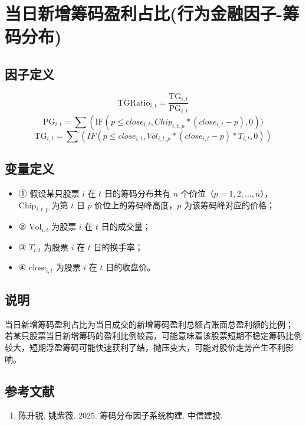 \documentclass{article}
\begin{document}
\section{当日新增筹码盈利占比(行为金融因子-筹码分布)}

\subsection{因子定义}
\begin{equation}
    \mathrm{TGRatio}_{i,t} = \frac{\mathrm{TG}_{i,t}}{\mathrm{PG}_{i,t}}
\end{equation}
\begin{equation}
    \mathrm{PG}_{i,t} = \sum \left( \mathrm{IF}(p\leq close_{i,t},Chip_{i,t,p}* (close_{i,t}-p),0))
\end{equation}
\begin{equation}
    \mathrm{TG}_{i,t} = \sum (IF(p \leq close_{i,t},Vol_{i,t,p}*(close_{i,t}-p)*T_{i,t},0))
\end{equation}

\subsection{变量定义}
\begin{itemize}
    \item ① 假设某只股票 \( i \) 在 \( t \) 日的筹码分布共有 \( n \) 个价位（\( p = 1, 2, \ldots, n \)），\( \mathrm{Chip}_{i,t,p} \) 为第 \( t \) 日 \( p \) 价位上的筹码峰高度，\( p \) 为该筹码峰对应的价格；
    \item ② \( \mathrm{Vol}_{i,t} \) 为股票 \( i \) 在 \( t \) 日的成交量；
    \item ③ \( T_{i,t} \) 为股票 \( i \) 在 \( t \) 日的换手率；
    \item ④ \( \mathrm{close}_{i,t} \) 为股票 \( i \) 在 \( t \) 日的收盘价。
\end{itemize}

\subsection{说明}
当日新增筹码盈利占比为当日成交的新增筹码盈利总额占账面总盈利额的比例；  
若某只股票当日新增筹码的盈利比例较高，可能意味着该股票短期不稳定筹码比例较大，短期浮盈筹码可能快速获利了结，抛压变大，可能对股价走势产生不利影响。

\subsection{参考文献}
\begin{enumerate}
    \item 陈升锐, 姚紫薇. 2025. 筹码分布因子系统构建. 中信建投.
\end{enumerate}
\end{document}
